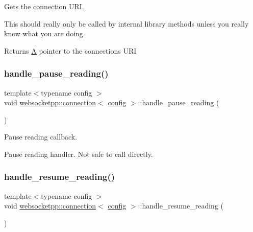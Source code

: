 Gets the connection U\+RI. 

This should really only be called by internal library methods unless you really know what you are doing.

\begin{DoxyReturn}{Returns}
\mbox{\hyperlink{struct_a}{A}} pointer to the connection\textquotesingle{}s U\+RI 
\end{DoxyReturn}
\mbox{\label{classwebsocketpp_1_1connection_a5887284ea346efd7b5cc43519bfd84d5}} 
\subsubsection{\texorpdfstring{handle\+\_\+pause\+\_\+reading()}{handle\_pause\_reading()}}
{\footnotesize\ttfamily template$<$typename config $>$ \\
void \mbox{\hyperlink{classwebsocketpp_1_1connection}{websocketpp\+::connection}}$<$ \mbox{\hyperlink{classconfig}{config}} $>$\+::handle\+\_\+pause\+\_\+reading (\begin{DoxyParamCaption}{ }\end{DoxyParamCaption})}



Pause reading callback. 

Pause reading handler. Not safe to call directly. \mbox{\label{classwebsocketpp_1_1connection_adb5b479b7d66eb289390b26d12332d84}} 
\subsubsection{\texorpdfstring{handle\+\_\+resume\+\_\+reading()}{handle\_resume\_reading()}}
{\footnotesize\ttfamily template$<$typename config $>$ \\
void \mbox{\hyperlink{classwebsocketpp_1_1connection}{websocketpp\+::connection}}$<$ \mbox{\hyperlink{classconfig}{config}} $>$\+::handle\+\_\+resume\+\_\+reading (\begin{DoxyParamCaption}{ }\end{DoxyParamCaption})}



